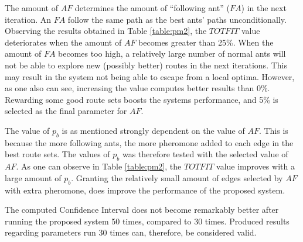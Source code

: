 The amount of $AF$ determines the amount of ``following ant'' ($FA$) in the next iteration. An $FA$ follow the same path as the best ants' paths unconditionally. Observing the results obtained in Table \vref{table:pm2}, the $TOTFIT$ value deteriorates when the amount of $AF$ becomes greater than 25\%. When the amount of $FA$ becomes too high, a relatively large number of normal ants will not be able to explore new (possibly better) routes in the next iterations. This may result in the system not being able to escape from a local optima. However, as one also can see, increasing the value computes better results than 0\%. Rewarding some good route sets boosts the systems performance, and 5\% is selected as the final parameter for $AF$. 

The value of $p_b$ is as mentioned strongly dependent on the value of $AF$. This is because the more following ants, the more pheromone added to each edge in the best route sets. The values of $p_b$ was therefore tested with the selected value of $AF$. As one can observe in Table \vref{table:pm2}, the $TOTFIT$ value improves with a large amount of $p_b$. Granting the relatively small amount of edges selected by $AF$ with extra pheromone, does improve the performance of the proposed system. 

The computed Confidence Interval does not become remarkably better after running the proposed system 50 times, compared to 30 times. Produced results regarding parameters run 30 times can, therefore, be considered valid.

